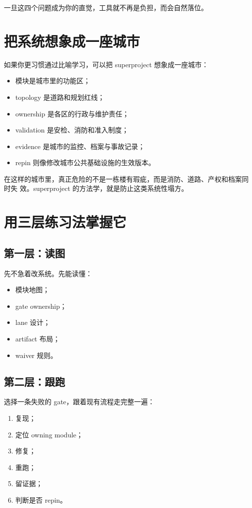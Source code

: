 \documentclass[UTF8,11pt,a4paper,oneside]{ctexbook}
\begin{document}
一旦这四个问题成为你的直觉，工具就不再是负担，而会自然落位。

\section{把系统想象成一座城市}

如果你更习惯通过比喻学习，可以把 superproject 想象成一座城市：

\begin{itemize}
  \item 模块是城市里的功能区；
  \item topology 是道路和规划红线；
  \item ownership 是各区的行政与维护责任；
  \item validation 是安检、消防和准入制度；
  \item evidence 是城市的监控、档案与事故记录；
  \item repin 则像修改城市公共基础设施的生效版本。
\end{itemize}

在这样的城市里，真正危险的不是一栋楼有瑕疵，而是消防、道路、产权和档案同时失
效。superproject 的方法学，就是防止这类系统性塌方。

\section{用三层练习法掌握它}

\subsection{第一层：读图}

先不急着改系统。先能读懂：

\begin{itemize}
  \item 模块地图；
  \item gate ownership；
  \item lane 设计；
  \item artifact 布局；
  \item waiver 规则。
\end{itemize}

\subsection{第二层：跟跑}

选择一条失败的 gate，跟着现有流程走完整一遍：

\begin{enumerate}
  \item 复现；
  \item 定位 owning module；
  \item 修复；
  \item 重跑；
  \item 留证据；
  \item 判断是否 repin。
\end{enumerate}
\end{document}
